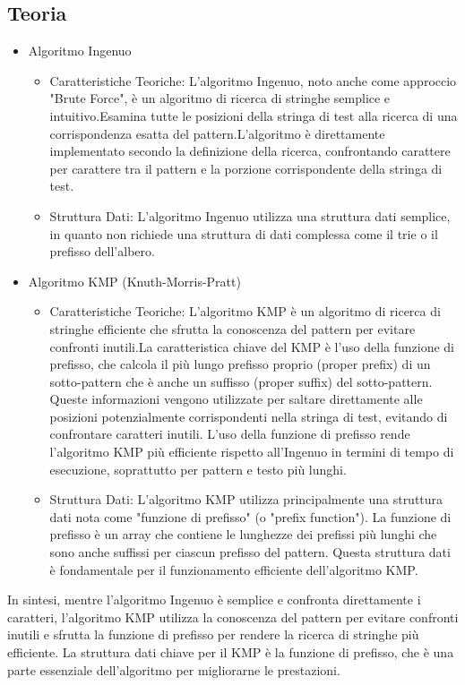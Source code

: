 \subsection{Teoria}
\label{sec:Teoria_1}
\begin{itemize}
    \item Algoritmo Ingenuo
    \begin{itemize}
        \item Caratteristiche Teoriche: L'algoritmo Ingenuo, noto anche come approccio "Brute Force", è un algoritmo di ricerca di stringhe semplice e intuitivo.Esamina tutte le posizioni della stringa di test alla ricerca di una corrispondenza esatta del pattern.L'algoritmo è direttamente implementato secondo la definizione della ricerca, confrontando carattere per carattere tra il pattern e la porzione corrispondente della stringa di test.
        \item Struttura Dati: L'algoritmo Ingenuo utilizza una struttura dati semplice, in quanto non richiede una struttura di dati complessa come il trie o il prefisso dell'albero.
    \end{itemize}
    \item Algoritmo KMP (Knuth-Morris-Pratt)
    \begin{itemize}
        \item Caratteristiche Teoriche: L'algoritmo KMP è un algoritmo di ricerca di stringhe efficiente che sfrutta la conoscenza del pattern per evitare confronti inutili.La caratteristica chiave del KMP è l'uso della funzione di prefisso, che calcola il più lungo prefisso proprio (proper prefix) di un sotto-pattern che è anche un suffisso (proper suffix) del sotto-pattern.
        Queste informazioni vengono utilizzate per saltare direttamente alle posizioni potenzialmente corrispondenti nella stringa di test, evitando di confrontare caratteri inutili.
        L'uso della funzione di prefisso rende l'algoritmo KMP più efficiente rispetto all'Ingenuo in termini di tempo di esecuzione, soprattutto per pattern e testo più lunghi.
        \item Struttura Dati: L'algoritmo KMP utilizza principalmente una struttura dati nota come "funzione di prefisso" (o "prefix function"). La funzione di prefisso è un array che contiene le lunghezze dei prefissi più lunghi che sono anche suffissi per ciascun prefisso del pattern. Questa struttura dati è fondamentale per il funzionamento efficiente dell'algoritmo KMP.
    \end{itemize}
\end{itemize}
In sintesi, mentre l'algoritmo Ingenuo è semplice e confronta direttamente i caratteri, l'algoritmo KMP utilizza la conoscenza del pattern per evitare confronti inutili e sfrutta la funzione di prefisso per rendere la ricerca di stringhe più efficiente. La struttura dati chiave per il KMP è la funzione di prefisso, che è una parte essenziale dell'algoritmo per migliorarne le prestazioni.


